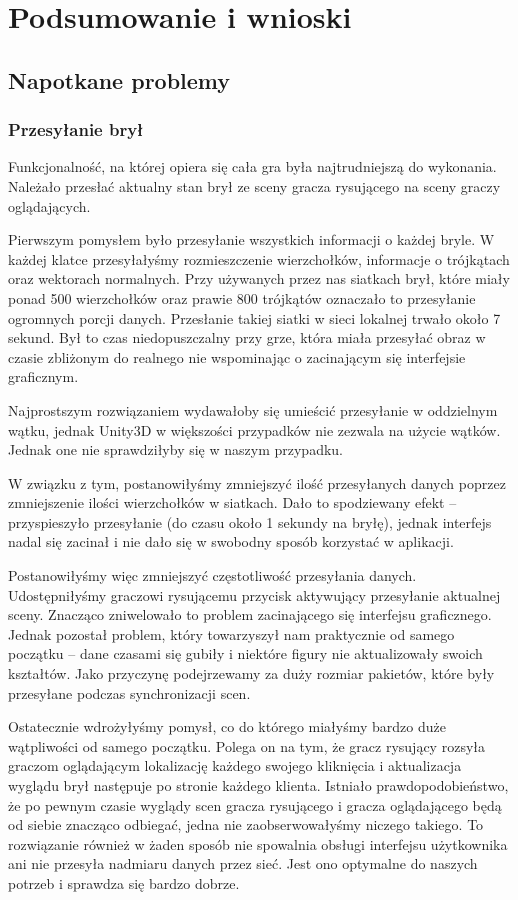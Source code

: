 \chapter{Podsumowanie i wnioski}
\section{Napotkane problemy}
\subsection{Przesyłanie brył}
Funkcjonalność, na której opiera się cała gra była najtrudniejszą do wykonania. Należało przesłać aktualny stan brył ze sceny gracza rysującego na sceny graczy oglądających.

Pierwszym pomysłem było przesyłanie wszystkich informacji o każdej bryle. W każdej klatce przesyłałyśmy rozmieszczenie wierzchołków, informacje o trójkątach oraz wektorach normalnych. Przy używanych przez nas siatkach brył, które miały ponad 500 wierzchołków oraz prawie 800 trójkątów oznaczało to przesyłanie ogromnych porcji danych. Przesłanie takiej siatki w sieci lokalnej trwało około 7 sekund. Był to czas niedopuszczalny przy grze, która miała przesyłać obraz w czasie zbliżonym do realnego nie wspominając o zacinającym się interfejsie graficznym.

Najprostszym rozwiązaniem wydawałoby się umieścić przesyłanie w oddzielnym wątku, jednak Unity3D w większości przypadków nie zezwala na użycie wątków. Jednak one nie sprawdziłyby się w naszym przypadku.

W związku z tym, postanowiłyśmy zmniejszyć ilość przesyłanych danych poprzez zmniejszenie ilości wierzchołków w siatkach. Dało to spodziewany efekt – przyspieszyło przesyłanie (do czasu około 1 sekundy na bryłę), jednak interfejs nadal się zacinał i nie dało się w swobodny sposób korzystać w aplikacji.

Postanowiłyśmy więc zmniejszyć częstotliwość przesyłania danych. Udostępniłyśmy graczowi rysującemu przycisk aktywujący przesyłanie aktualnej sceny. Znacząco zniwelowało to problem zacinającego się interfejsu graficznego. Jednak pozostał problem, który towarzyszył nam praktycznie od samego początku – dane czasami się gubiły i niektóre figury nie aktualizowały swoich kształtów. Jako przyczynę podejrzewamy za duży rozmiar pakietów, które były przesyłane podczas synchronizacji scen.

Ostatecznie wdrożyłyśmy pomysł, co do którego miałyśmy bardzo duże wątpliwości od samego początku. Polega on na tym, że gracz rysujący rozsyła graczom oglądającym lokalizację każdego swojego kliknięcia i aktualizacja wyglądu brył następuje po stronie każdego klienta. Istniało prawdopodobieństwo, że po pewnym czasie wyglądy scen gracza rysującego i gracza oglądającego będą od siebie znacząco odbiegać, jedna nie zaobserwowałyśmy niczego takiego. To rozwiązanie również w żaden sposób nie spowalnia obsługi interfejsu użytkownika ani nie przesyła nadmiaru danych przez sieć. Jest ono optymalne do naszych potrzeb i sprawdza się bardzo dobrze.

